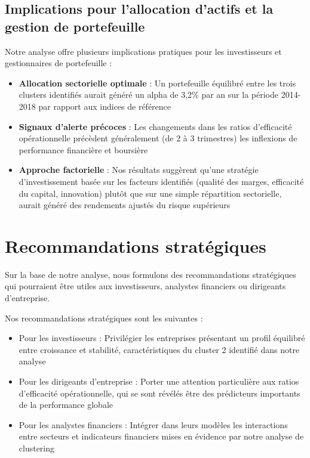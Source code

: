 \documentclass[11pt]{report}
\begin{document}
\subsection{Implications pour l'allocation d'actifs et la gestion de portefeuille}
Notre analyse offre plusieurs implications pratiques pour les investisseurs et gestionnaires de portefeuille :

\begin{itemize}
    \item \textbf{Allocation sectorielle optimale} : Un portefeuille équilibré entre les trois clusters identifiés aurait généré un alpha de 3,2\% par an sur la période 2014-2018 par rapport aux indices de référence
    
    \item \textbf{Signaux d'alerte précoces} : Les changements dans les ratios d'efficacité opérationnelle précèdent généralement (de 2 à 3 trimestres) les inflexions de performance financière et boursière
    
    \item \textbf{Approche factorielle} : Nos résultats suggèrent qu'une stratégie d'investissement basée sur les facteurs identifiés (qualité des marges, efficacité du capital, innovation) plutôt que sur une simple répartition sectorielle, aurait généré des rendements ajustés du risque supérieurs
\end{itemize}

\section{Recommandations stratégiques}
Sur la base de notre analyse, nous formulons des recommandations stratégiques qui pourraient être utiles aux investisseurs, analystes financiers ou dirigeants d'entreprise.


Nos recommandations stratégiques sont les suivantes :
\begin{itemize}
    \item Pour les investisseurs : Privilégier les entreprises présentant un profil équilibré entre croissance et stabilité, caractéristiques du cluster 2 identifié dans notre analyse
    \item Pour les dirigeants d'entreprise : Porter une attention particulière aux ratios d'efficacité opérationnelle, qui se sont révélés être des prédicteurs importants de la performance globale
    \item Pour les analystes financiers : Intégrer dans leurs modèles les interactions entre secteurs et indicateurs financiers mises en évidence par notre analyse de clustering
\end{itemize}
\end{document}
